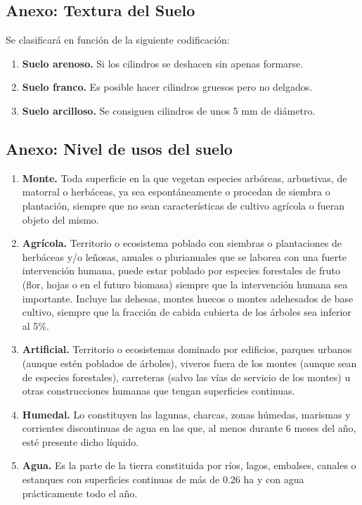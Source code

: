 \subsection{Anexo: Textura del Suelo}\label{sec:textura}

Se clasificará en función de la siguiente codificación:

\begin{enumerate}
    \item \textbf{Suelo arenoso.} Si los cilindros se deshacen sin apenas formarse.
    \item \textbf{Suelo franco.} Es posible hacer cilindros gruesos pero no delgados.
    \item \textbf{Suelo arcilloso.} Se consiguen cilindros de unos 5 mm de diámetro.
\end{enumerate}

\subsection{Anexo: Nivel de usos del suelo}\label{sec:nivel1}

\begin{enumerate}
    \item \textbf{Monte.} Toda superficie en la que vegetan especies arbóreas, arbustivas, de matorral o herbáceas, ya sea espontáneamente o procedan de siembra o plantación, siempre que no sean características de cultivo agrícola o fueran objeto del mismo.
    \item \textbf{Agrícola.} Territorio o ecosistema poblado con siembras o plantaciones de herbáceas y/o leñosas, anuales o plurianuales que se laborea con una fuerte intervención humana, puede estar poblado por especies forestales de fruto (flor, hojas o en el futuro biomasa) siempre que la intervención humana sea importante. Incluye las dehesas, montes huecos o montes adehesados de base cultivo, siempre que la fracción de cabida cubierta de los árboles sea inferior al 5\%.
    \item \textbf{Artificial.} Territorio o ecosistemas dominado por edificios, parques urbanos (aunque estén poblados de árboles), viveros fuera de los montes (aunque sean de especies forestales), carreteras (salvo las vías de servicio de los montes) u otras construcciones humanas que tengan superficies continuas.
    \item \textbf{Humedal.} Lo constituyen las lagunas, charcas, zonas húmedas, marismas y corrientes discontinuas de agua en las que, al menos durante 6 meses del año, esté presente dicho líquido.
    \item \textbf{Agua.} Es la parte de la tierra constituida por ríos, lagos, embalses, canales o estanques con superficies continuas de más de 0.26 ha y con agua prácticamente todo el año.
\end{enumerate}


